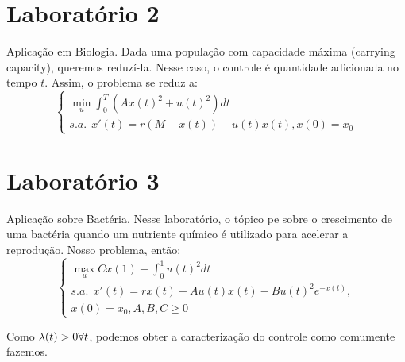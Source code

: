 \section{Laboratório 2}

Aplicação em Biologia. Dada uma população com capacidade máxima (carrying capacity), queremos reduzí-la. Nesse caso, o controle é quantidade adicionada no tempo $t$. Assim, o problema se reduz a:
\begin{equation}
    \begin{cases}
    \min_u \int_0^T (Ax(t)^2 + u(t)^2) dt \\
    s.a.~~ x'(t) = r(M - x(t)) - u(t)x(t), x(0) = x_0
    \end{cases}
\end{equation}

\section{Laboratório 3}

Aplicação sobre Bactéria. Nesse laboratório, o tópico pe sobre o crescimento de uma bactéria quando um nutriente químico é utilizado para acelerar a reprodução. Nosso problema, então:
\begin{equation}
    \begin{cases}
    \max_u Cx(1) - \int_0^1 u(t)^2 dt \\
    s.a.~~ x'(t) = rx(t) + Au(t)x(t) - Bu(t)^2e^{-x(t)}, \\
    x(0) = x_0, A, B, C \geq 0
    \end{cases}
\end{equation}

Como $\lambda(t) > 0 \forall t$, podemos obter a caracterização do controle como comumente fazemos.

